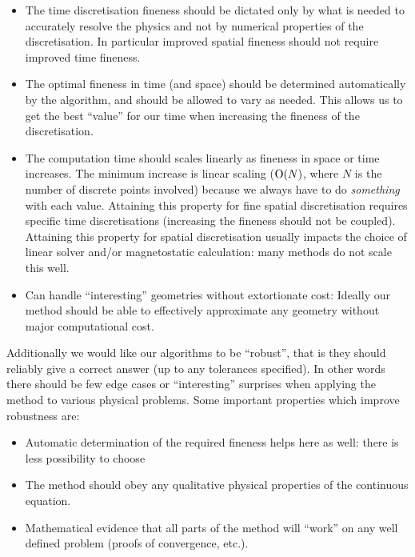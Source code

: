 \begin{itemize}
\item The time discretisation fineness should be dictated only by what is needed to accurately resolve the physics and not by numerical properties of the discretisation.
  In particular improved spatial fineness should not require improved time fineness.

\item The optimal fineness in time (and space) should be determined automatically by the algorithm, and should be allowed to vary as needed.
  This allows us to get the best ``value'' for our time when increasing the fineness of the discretisation.

\item The computation time should scales linearly as fineness in space or time increases.
  The minimum increase is linear scaling ($\text{O}{\left( N \right)}$, where $N$ is the number of discrete points involved) because we always have to do \emph{something} with each value.
  Attaining this property for fine spatial discretisation requires specific time discretisations (\ie increasing the fineness should not be coupled).
  Attaining this property for spatial discretisation usually impacts the choice of linear solver and/or magnetostatic calculation: many methods do not scale this well.

\item Can handle ``interesting'' geometries without extortionate cost:
  Ideally our method should be able to effectively approximate any geometry without major computational cost.
\end{itemize}

Additionally we would like our algorithms to be ``robust'', that is they should reliably give a correct answer (up to any tolerances specified).
In other words there should be few edge cases or ``interesting'' surprises when applying the method to various physical problems.
Some important properties which improve robustness are:
\begin{itemize}
\item Automatic determination of the required fineness helps here as well: there is less possibility to choose 

\item The method should obey any qualitative physical properties of the continuous equation. 

\item Mathematical evidence that all parts of the method will ``work'' on any well defined problem (\eg proofs of convergence, etc.).
\end{itemize}


